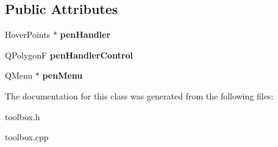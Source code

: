 \subsection*{Public Attributes}
\begin{DoxyCompactItemize}
\item 
\hypertarget{class_pen_tool_function_aa19ea9aad1259a20773d684e89dbbe1b}{Hover\-Points $\ast$ {\bfseries pen\-Handler}}\label{class_pen_tool_function_aa19ea9aad1259a20773d684e89dbbe1b}

\item 
\hypertarget{class_pen_tool_function_a8b1e4989a925ecb9539dea62bf1d1d16}{Q\-Polygon\-F {\bfseries pen\-Handler\-Control}}\label{class_pen_tool_function_a8b1e4989a925ecb9539dea62bf1d1d16}

\item 
\hypertarget{class_pen_tool_function_a1e3c29909108f341004171395ca13bc8}{Q\-Menu $\ast$ {\bfseries pen\-Menu}}\label{class_pen_tool_function_a1e3c29909108f341004171395ca13bc8}

\end{DoxyCompactItemize}


The documentation for this class was generated from the following files\-:\begin{DoxyCompactItemize}
\item 
toolbox.\-h\item 
toolbox.\-cpp\end{DoxyCompactItemize}
